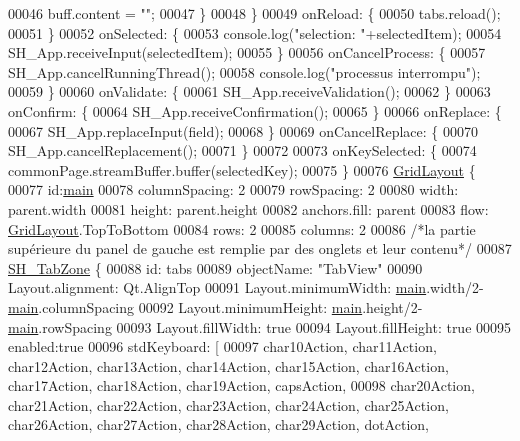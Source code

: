 \begin{DoxyCode}
00046             buff.content = \textcolor{stringliteral}{""};
00047         \}
00048     \}
00049     onReload: \{
00050         tabs.reload();
00051     \}
00052     onSelected: \{
00053         console.log(\textcolor{stringliteral}{"selection: "}+selectedItem);
00054         SH\_App.receiveInput(selectedItem);
00055     \}
00056     onCancelProcess: \{
00057         SH\_App.cancelRunningThread();
00058         console.log(\textcolor{stringliteral}{"processus interrompu"});
00059     \}
00060     onValidate: \{
00061         SH\_App.receiveValidation();
00062     \}
00063     onConfirm: \{
00064         SH\_App.receiveConfirmation();
00065     \}
00066     onReplace: \{
00067         SH\_App.replaceInput(field);
00068     \}
00069     onCancelReplace: \{
00070         SH\_App.cancelReplacement();
00071     \}
00072 
00073     onKeySelected: \{
00074         commonPage.streamBuffer.buffer(selectedKey);
00075     \}
00076     \hyperlink{classGridLayout}{GridLayout} \{
00077         \textcolor{keywordtype}{id}:\hyperlink{main_8cpp_a3c04138a5bfe5d72780bb7e82a18e627}{main}
00078         columnSpacing: 2
00079         rowSpacing: 2
00080         width: parent.width
00081         height: parent.height
00082         anchors.fill: parent
00083         flow: \hyperlink{classGridLayout}{GridLayout}.TopToBottom
00084         rows: 2
00085         columns: 2
00086         \textcolor{comment}{/*la partie supérieure du panel de gauche est remplie par des onglets et leur contenu*/}
00087         \hyperlink{classSH__TabZone}{SH\_TabZone} \{
00088             \textcolor{keywordtype}{id}: tabs
00089             objectName: \textcolor{stringliteral}{"TabView"}
00090             Layout.alignment: Qt.AlignTop
00091             Layout.minimumWidth: \hyperlink{main_8cpp_a3c04138a5bfe5d72780bb7e82a18e627}{main}.width/2-\hyperlink{main_8cpp_a3c04138a5bfe5d72780bb7e82a18e627}{main}.columnSpacing
00092             Layout.minimumHeight: \hyperlink{main_8cpp_a3c04138a5bfe5d72780bb7e82a18e627}{main}.height/2-\hyperlink{main_8cpp_a3c04138a5bfe5d72780bb7e82a18e627}{main}.rowSpacing
00093             Layout.fillWidth: \textcolor{keyword}{true}
00094             Layout.fillHeight: \textcolor{keyword}{true}
00095             enabled:\textcolor{keyword}{true}
00096             stdKeyboard: [
00097                 char10Action, char11Action, char12Action, char13Action, char14Action, char15Action, 
      char16Action, char17Action, char18Action, char19Action, capsAction,
00098                 char20Action, char21Action, char22Action, char23Action, char24Action, char25Action, 
      char26Action, char27Action, char28Action, char29Action, dotAction,

\end{DoxyCode}
